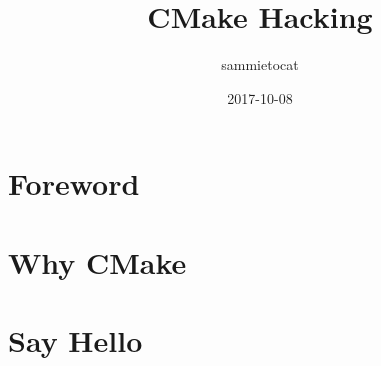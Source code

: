 \documentclass[a4paper,10pt]{book}
\title{CMake Hacking}
\author{sammietocat}
\date{2017-10-08}
\begin{document}
\maketitle
\tableofcontents

\iffalse
\begin{mquote}
  Hello Box
\end{mquote}
\fi

\chapter*{Foreword}
  

\chapter{Why CMake}
  

\chapter{Say Hello}
  
\end{document}

